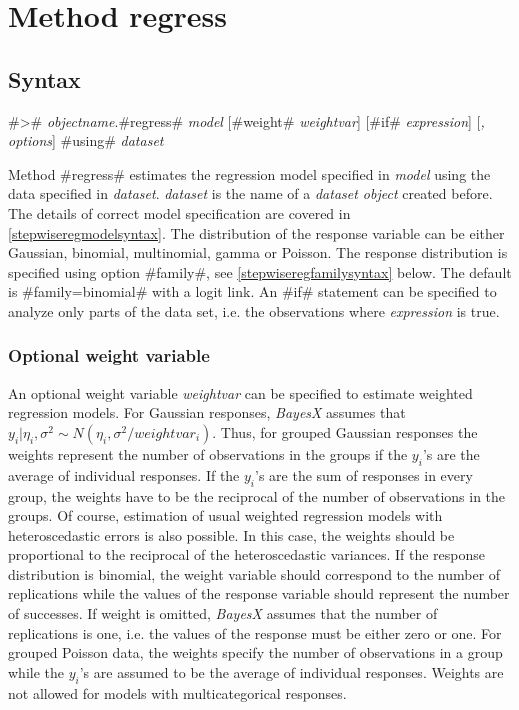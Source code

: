 \clearpage

\section{Method regress}
  \label{stepwiseregregress}

\subsection{Syntax}
\label{stepwiseregregresssyntax}

#># {\em objectname}.#regress# {\em model} [#weight# {\em weightvar}] [#if# {\em expression}] [{\em , options}] #using# {\em dataset}

Method #regress# estimates the regression model specified in {\em
model} using the data specified in {\em dataset}. {\em dataset} is
the name of a {\em dataset object} created before. The details
of correct model specification are covered in
\autoref{stepwiseregmodelsyntax}. The distribution of the response
variable can be either Gaussian, binomial, multinomial, gamma or Poisson.
The response distribution is specified using
option #family#, see \autoref{stepwiseregfamilysyntax} below. The
default is #family=binomial# with a logit link. An #if# statement
can be specified to analyze only parts of the data set, i.e. the
observations where {\em expression} is true.

\subsubsection{Optional weight variable}
\label{stepwiseregweightspecification}

An optional weight variable {\em weightvar} can be specified to
estimate weighted regression models. For Gaussian responses, {\em
BayesX} assumes that $y_i|\eta_i,\sigma^2 \sim
N(\eta_i,\sigma^2/weightvar_i)$. Thus, for grouped Gaussian
responses the weights represent the number of observations in the
groups if the $y_i$'s are the average of individual responses. If
the $y_i$'s are the sum of responses in every group, the weights have
to be the reciprocal of the number of observations in the groups. Of
course, estimation of usual weighted regression models with
heteroscedastic errors is also possible. In this case, the weights
should be proportional to the reciprocal of the heteroscedastic
variances. If the response distribution is binomial, the weight
variable should correspond to the number of replications while the
values of the response variable should represent the number of
successes. If weight is omitted, {\em BayesX} assumes that the
number of replications is one, i.e. the values of the response must
be either zero or one. For grouped Poisson data, the weights
specify the number of observations in a group while the $y_i$'s are
assumed to be the average of individual responses. Weights are not
allowed for models with multicategorical responses.

